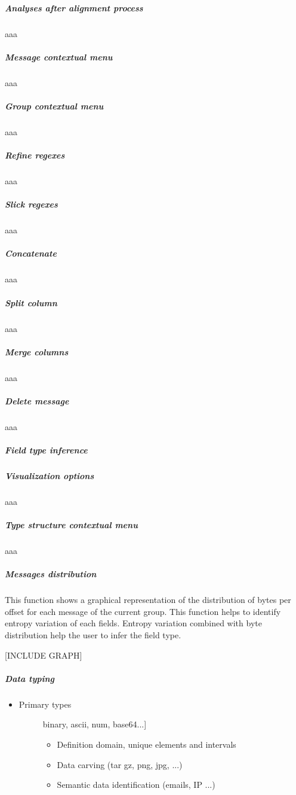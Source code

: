 \documentclass[letterpaper,10pt,english]{sphinxmanual}
\begin{document}
\subparagraph{Analyses after alignment process}
\label{modelization/vocabular:analyses-after-alignment-process}
aaa


\subparagraph{Message contextual menu}
\label{modelization/vocabular:message-contextual-menu}
aaa


\subparagraph{Group contextual menu}
\label{modelization/vocabular:group-contextual-menu}
aaa


\subparagraph{Refine regexes}
\label{modelization/vocabular:refine-regexes}
aaa


\subparagraph{Slick regexes}
\label{modelization/vocabular:slick-regexes}
aaa


\subparagraph{Concatenate}
\label{modelization/vocabular:concatenate}
aaa


\subparagraph{Split column}
\label{modelization/vocabular:split-column}
aaa


\subparagraph{Merge columns}
\label{modelization/vocabular:merge-columns}
aaa


\subparagraph{Delete message}
\label{modelization/vocabular:delete-message}
aaa


\subparagraph{Field type inference}
\label{modelization/vocabular:field-type-inference}

\subparagraph{Visualization options}
\label{modelization/vocabular:visualization-options}
aaa


\subparagraph{Type structure contextual menu}
\label{modelization/vocabular:type-structure-contextual-menu}
aaa


\subparagraph{Messages distribution}
\label{modelization/vocabular:messages-distribution}
This function shows a graphical representation of the distribution of bytes per offset for each message of the current group. This function helps to identify entropy variation of each fields. Entropy variation combined with byte distribution help the user to infer the field type.

{[}INCLUDE GRAPH{]}


\subparagraph{Data typing}
\label{modelization/vocabular:data-typing}\begin{itemize}
\item {} \begin{description}
\item[{Primary types}] \leavevmode{[}binary, ascii, num, base64...{]}\begin{itemize}
\item {} 
Definition domain, unique elements and intervals

\item {} 
Data carving (tar gz, png, jpg, ...)

\item {} 
Semantic data identification (emails, IP ...)

\end{itemize}

\end{description}

\end{itemize}
\end{document}
